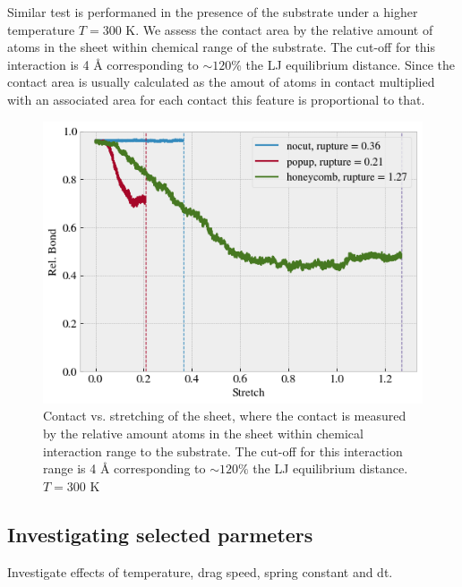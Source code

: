 Similar test is performaned in the presence of the substrate under a higher temperature $T = 300$ K. We assess the contact area by the relative amount of atoms in the sheet within chemical range of the substrate. The cut-off for this interaction is 4 Å corresponding to $\sim 120$\% the LJ equilibrium distance. Since the contact area is usually calculated as the amout of atoms in contact multiplied with an associated area for each contact this feature is proportional to that. 

\begin{figure}[H]
  \centering
  \includegraphics[width=0.6\linewidth]{figures/baseline/contact_vs_stretch.png}
  \caption{Contact vs. stretching of the sheet, where the contact is measured by the relative amount atoms in the sheet within chemical interaction range to the substrate. The cut-off for this interaction range is 4 Å corresponding to $\sim 120 \%$ the LJ equilibrium distance. $T = 300$ K }
  \label{fig:contact_vs_stretch}
\end{figure}




\newpage
\subsection{Investigating selected parmeters}
Investigate effects of temperature, drag speed, spring constant and dt.


